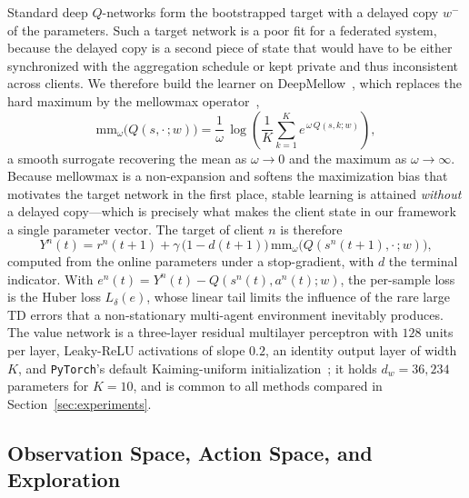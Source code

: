 \documentclass[journal]{IEEEtran}
\begin{document}
Standard deep $Q$-networks form the bootstrapped target with a delayed copy
$w^{-}$ of the parameters. Such a target network is a poor fit for a federated
system, because the delayed copy is a second piece of state that would have to
be either synchronized with the aggregation schedule or kept private and thus
inconsistent across clients. We therefore build the learner on
DeepMellow~\cite{kim2019deepmellow}, which replaces the hard maximum by the
mellowmax operator~\cite{asadi2017alternative},
\begin{equation}
\mathrm{mm}_{\omega}\bigl(Q(s,\cdot\,;w)\bigr)
 = \frac{1}{\omega}\,
   \log\!\left(\frac{1}{K}\sum_{k=1}^{K} e^{\,\omega\, Q(s,k;w)}\right),
\label{eq:mellowmax}
\end{equation}
a smooth surrogate recovering the mean as $\omega\to 0$ and the maximum as
$\omega\to\infty$. Because mellowmax is a non-expansion and softens the
maximization bias that motivates the target network in the first place, stable
learning is attained \emph{without} a delayed copy---which is precisely what
makes the client state in our framework a single parameter vector. The target
of client $n$ is therefore
\begin{equation}
Y^{n}(t) = r^{n}(t+1)
  + \gamma\,\bigl(1 - d(t+1)\bigr)\,
    \mathrm{mm}_{\omega}\bigl(Q(s^{n}(t+1),\cdot\,;w)\bigr),
\label{eq:target}
\end{equation}
computed from the online parameters under a stop-gradient, with $d$ the
terminal indicator. With $e^{n}(t)=Y^{n}(t)-Q(s^{n}(t),a^{n}(t);w)$, the
per-sample loss is the Huber loss $L_{\delta}(e)$, whose linear tail limits the
influence of the rare large TD errors that a non-stationary multi-agent
environment inevitably produces. The value network is a three-layer residual
multilayer perceptron with $128$ units per layer, Leaky-ReLU activations of
slope $0.2$, an identity output layer of width $K$, and \texttt{PyTorch}'s
default Kaiming-uniform initialization~\cite{he2015delving}; it holds
$d_{w}=36{,}234$ parameters for $K=10$, and is common to all methods compared
in Section~\ref{sec:experiments}.

\subsection{Observation Space, Action Space, and Exploration}
\label{subsec:method_state}
\end{document}
